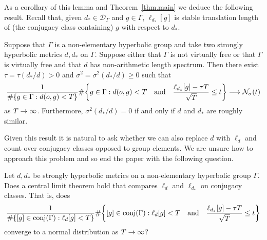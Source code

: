 \documentclass[AHL,Unicode,longabstracts,published]{cedram}
\newcommand{\G}{\Gamma}
\newcommand{\Dc}{\mathcal{D}}
\newcommand{\Nc}{\mathcal{N}}
\DeclareMathOperator{\conjj}{conj}
\let\originalleft\left
\let\originalright\right
\renewcommand{\left}{\mathopen{}\mathclose\bgroup\originalleft}
\renewcommand{\right}{\aftergroup\egroup\originalright}
\renewcommand*{\to}{\mathchoice{\longrightarrow}{\rightarrow}{\rightarrow}{\rightarrow}}
\theoremstyle{plain}
\newcommand{\G}{\Gamma}
\begin{document}
As a corollary of this lemma and Theorem~\ref{thm.main} we deduce the following result. Recall that, given $d_\ast \in \Dc_\G$ and $g \in \G$, $\ell_{d_\ast}[g]$ is stable translation length of (the conjugacy class containing) $g$ with respect to $d_\ast$.

\begin{coro}
Suppose that $\G$ is a non-elementary hyperbolic group and take two strongly hyperbolic metrics $d,d_\ast$ on $\G$. Suppose either that $\G$ is not virtually free or that $\G$ is virtually free and that $d$ has non-arithmetic length spectrum. Then there exist $\tau = \tau(d_\ast/d) >0$ and $\sigma^2 = \sigma^2(d_\ast/d) \ge 0$ such that
\[
\frac{1}{\#\{ g \in \G: d(o,g) < T\}} \#\left\{ g \in \G: d(o,g) < T \quad\text{and}\quad \frac{\ell_{d_\ast}[g] - \tau T}{\sqrt{T}} \le t \right\} \to \Nc_\sigma(t)
\]
as $T\to\infty$. Furthermore, $\sigma^2(d_\ast/d) = 0$ if and only if $d$ and $d_\ast$ are roughly similar.
\end{coro}

Given this result it is natural to ask whether we can also replace $d$ with $\ell_d$ and count over conjugacy classes opposed to group elements. We are unsure how to approach this problem and so end the paper with the following question.

\pagebreak{}
\begin{ques}
Let $d,d_\ast$ be strongly hyperbolic metrics on a non-elementary hyperbolic group $\G$. Does a central limit theorem hold that compares $\ell_d$ and $\ell_{d_\ast}$ on conjugacy classes. That is, does
\[
\frac{1}{\#\left\{ [g] \in \conjj(\G): \ell_d[g] < T\right\}} \#\left\{ [g] \in \conjj(\G): \ell_d[g] < T \quad \text{and}\quad \frac{\ell_{d_\ast}[g] - \tau T}{\sqrt{T}} \le t \right\}
\]
converge to a normal distribution as $T\to\infty$?
\end{ques}



\end{document}
